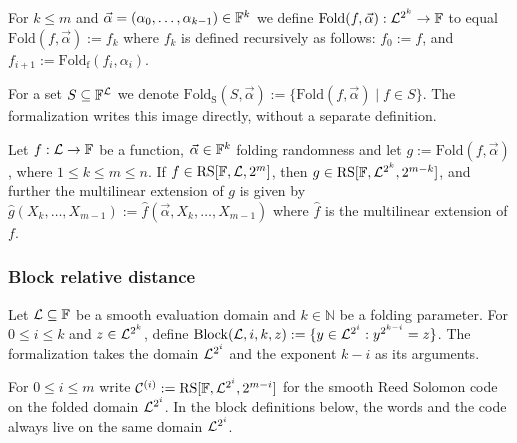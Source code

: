 \begin{definition}\label{def:fold_k}
\leanok
{}
    For $k \leq m$ and $\vec{\alpha} = (\alpha_0, \ldots, \alpha_{k-1}) \in \mathbb{F}^k$ we define $\mathrm{Fold}(f, \vec{\alpha}) : \mathcal{L}^{2^k} \to \mathbb{F}$ to equal $\mathrm{Fold}(f, \vec{\alpha}) := f_k$ where $f_k$ is defined recursively as follows: $f_0 := f$, and $f_{i+1} := \mathrm{Fold_f}(f_{i}, \alpha_i)$.
\end{definition}

\begin{definition}\label{def:fold_k_set}
    For a set $S \subseteq \mathbb{F}^{\mathcal{L}}$ we denote $\mathrm{Fold_{S}}(S, \vec{\alpha}) := \{\mathrm{Fold}(f, \vec{\alpha}) \mid f \in S\}$.
    The formalization writes this image directly, without a separate definition.
\end{definition}

\begin{lemma}\label{lemma:fold_fg}
\leanok
{}
    Let $f : \mathcal{L} \to \mathbb{F}$ be a function, $\vec{\alpha} \in \mathbb{F}^k$ folding randomness and let $g := \mathrm{Fold}(f, \vec{\alpha})$, where $1\le k \leq m\le n$. If $f \in \mathrm{RS}[\mathbb{F}, \mathcal{L}, 2^m]$, then $g \in \mathrm{RS}[\mathbb{F}, \mathcal{L}^{2^k}, 2^{m - k}]$, and further the multilinear extension of $g$ is given by $\hat{g}(X_k, \ldots, X_{m-1}) := \hat{f}(\vec{\alpha}, X_k, \ldots, X_{m-1})$ where $\hat{f}$ is the multilinear extension of $f$.
\end{lemma}

\subsubsection{Block relative distance}

\begin{definition}\label{def:block}
\leanok
    Let $\mathcal{L} \subseteq \mathbb{F}$ be a smooth evaluation domain and $k \in \mathbb{N}$ be a folding parameter. For $0\le i\le k$ and $z \in \mathcal{L}^{2^k}$, define $\mathrm{Block}(\mathcal{L}, i, k, z) := \{ y \in \mathcal{L}^{2^i} : y^{2^{k-i}} = z \}$.
    The formalization takes the domain $\mathcal{L}^{2^i}$ and the exponent $k-i$ as its arguments.
\end{definition}

For $0\le i\le m$ write $\mathcal{C}^{(i)} := \mathrm{RS}[\mathbb{F}, \mathcal{L}^{2^i}, 2^{m-i}]$ for the smooth
Reed Solomon code on the folded domain $\mathcal{L}^{2^i}$. In the block definitions below, the
words and the code always live on the same domain $\mathcal{L}^{2^i}$.

